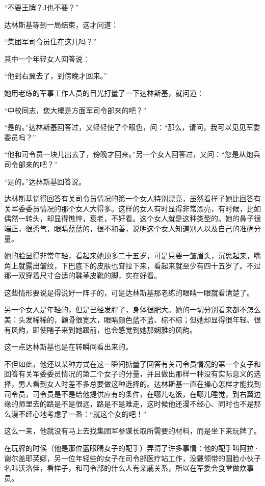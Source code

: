 “不要王牌？J也不要？”

达林斯基等到一局结束，这才问道：

“集团军司令员住在这儿吗？”

其中一个年轻女人回答说：

“他到右翼去了，到傍晚才回来。”

她用老练的军事工作人员的目光打量了一下达林斯基，就问道：

“中校同志，您大概是方面军司令部来的吧？”

“是的。”达林斯基回答过，又轻轻使了个眼色，问：“那么，请问，我可以见见军委委员吗？”

“他和司令员一块儿出去了，傍晚才回来。”另一个女人回答过，又问：“您是从炮兵司令部来的吧？”

“是的。”达林斯基回答说。

达林斯基觉得回答有关司令员情况的第一个女人特别漂亮，虽然看样子她比回答有关军委委员情况的那个女人大得多。这样的女人有时显得非常漂亮，有时候，比如偶然一转头，却显得憔悴，衰老，不好看。这个女人就是这种类型的。她的鼻子很端正，很秀气，眼睛蓝蓝的，很不和善，说明这个女人知道别人以及自己的准确分量。

她的脸显得非常年轻，看起来她顶多二十五岁，可是只要一皱眉头，沉思起来，嘴角上就露出皱纹，下巴底下的皮肤也耷拉下来，看起来就至少有四十五岁了。不过那一双穿着尺寸合适的鞣革皮靴的脚，实在好看。

这些情形要说是得说好一阵子的，可是达林斯基那老练的眼睛一眼就看清楚了。

另一个女人是年轻的，但是已经发胖了，身体很肥大。她的一切分别看来都不怎么美：头发稀稀的，颧骨很宽大，眼睛颜色蓝不蓝、棕不棕；但她却显得很年轻、很有风韵，即使瞎子来到她跟前，也会感觉到她那娴雅的风韵。

这一点达林斯基也是在转瞬间看出来的。

不但如此，他还以某种方式在这一瞬间掂量了回答有关司令员情况的第一个女子和回答有关军委委员情况的第二个女子的分量，并且做出那样一种没有实际意义的选择，男人看到女人时差不多总要做这种选择的。达林斯基一直在操心怎样才能找到司令员，司令员是不是给他提供应有的条件，在哪儿吃饭，在哪儿睡觉，到右翼边缘的师里去的路是不是很远，路是不是难走，这时候他还漫不经心、同时也不是那么漫不经心地考虑了一番：“就这个女的吧！”

这么一来，他就没有马上去找集团军参谋长取所需要的材料，而是坐下来玩牌了。

在玩牌的时候（他是那位蓝眼睛女子的配手）弄清了许多事情：他的配手叫阿拉·谢尔盖耶芙娜，另一位年轻些的女子在司令部医疗站工作，没戴领带的圆脸小伙子名叫沃洛佳，看样子，和司令部的什么人有亲戚关系，所以在军委会食堂做炊事员。

